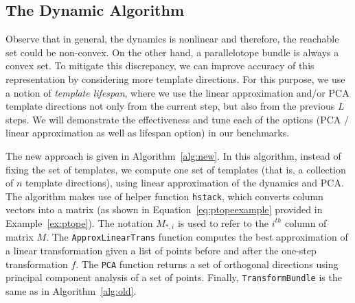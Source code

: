 \subsection{The Dynamic Algorithm}
\label{sec:dyna_algo}
Observe that in general, the dynamics is nonlinear and therefore, the reachable set could be non-convex.
%
On the other hand, a parallelotope bundle is always a convex set.
%
To mitigate this discrepancy, we can improve accuracy of this representation by considering more template directions.
%
For this purpose, we use a notion of \emph{template lifespan}, where we use the linear approximation and/or PCA template directions not only from the current step, but also from the previous $L$ steps.
%
We will demonstrate the effectiveness and tune each of the options (PCA / linear approximation as well as lifespan option) in our benchmarks.

The new approach is given in Algorithm~\ref{alg:new}.
%
In this algorithm, instead of fixing the set of templates, we compute one set of templates (that is, a collection of $n$ template directions), using linear approximation of the dynamics and PCA.
%
The algorithm makes use of helper function \texttt{hstack}, which converts column vectors into a matrix (as shown in Equation~\ref{eq:ptopeexample} provided in Example~\ref{ex:ptope}).
%
The notation $M_{*,i}$ is used to refer to the $i^{th}$ column of matrix $M$.
%
The \texttt{ApproxLinearTrans} function computes the best approximation of a linear transformation given a list of points before and after the one-step transformation $f$.
%
%
%
The \texttt{PCA} function returns a set of orthogonal directions using principal component analysis of a set of points.
%
Finally, \texttt{TransformBundle} is the same as in Algorithm~\ref{alg:old}.



